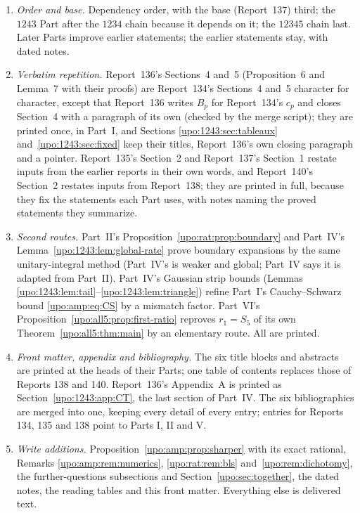 \documentclass[11pt,letterpaper]{article}
\theoremstyle{remark}\newtheorem{remark}[theorem]{Remark}
\numberwithin{equation}{section}
\begin{document}
\begin{enumerate}
\item \emph{Order and base.} Dependency order, with the base (Report~137) third; the $1243$ Part after the $1234$ chain because it depends on it; the $12345$ chain last. Later Parts improve earlier statements; the earlier statements stay, with dated notes.
\item \emph{Verbatim repetition.} Report~136's Sections~4 and~5 (Proposition~6 and Lemma~7 with their proofs) are Report~134's Sections~4 and~5 character for character, except that Report~136 writes $B_p$ for Report~134's $c_p$ and closes Section~4 with a paragraph of its own (checked by the merge script); they are printed once, in Part~I, and Sections \ref{upo:1243:sec:tableaux} and~\ref{upo:1243:sec:fixed} keep their titles, Report~136's own closing paragraph and a pointer. Report~135's Section~2 and Report~137's Section~1 restate inputs from the earlier reports in their own words, and Report~140's Section~2 restates inputs from Report~138; they are printed in full, because they fix the statements each Part uses, with notes naming the proved statements they summarize.
\item \emph{Second routes.} Part~II's Proposition~\ref{upo:rat:prop:boundary} and Part~IV's Lemma~\ref{upo:1243:lem:global-rate} prove boundary expansions by the same unitary-integral method (Part~IV's is weaker and global; Part~IV says it is adapted from Part~II). Part~IV's Gaussian strip bounds (Lemmas \ref{upo:1243:lem:tail}--\ref{upo:1243:lem:triangle}) refine Part~I's Cauchy--Schwarz bound \eqref{upo:amp:eq:CS} by a mismatch factor. Part~VI's Proposition~\ref{upo:all5:prop:first-ratio} reproves $r_1=S_5$ of its own Theorem~\ref{upo:all5:thm:main} by an elementary route. All are printed.
\item \emph{Front matter, appendix and bibliography.} The six title blocks and abstracts are printed at the heads of their Parts; one table of contents replaces those of Reports 138 and 140. Report~136's Appendix~A is printed as Section~\ref{upo:1243:app:CT}, the last section of Part~IV. The six bibliographies are merged into one, keeping every detail of every entry; entries for Reports 134, 135 and 138 point to Parts I, II and V.
\item \emph{Write additions.} Proposition~\ref{upo:amp:prop:sharper} with its exact rational, Remarks \ref{upo:amp:rem:numerics}, \ref{upo:rat:rem:bls} and~\ref{upo:rem:dichotomy}, the further-questions subsections and Section~\ref{upo:sec:together}, the dated notes, the reading tables and this front matter. Everything else is delivered text.
\end{enumerate}
\end{document}
